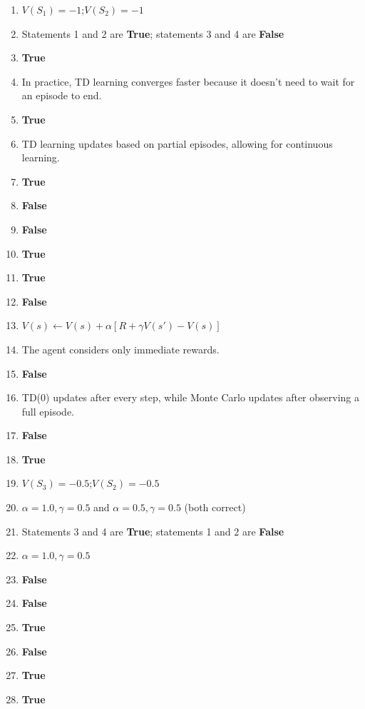 \documentclass[11pt,oneside]{article}
\begin{document}
\begin{enumerate}[label=\textbf{Q\arabic*.}, leftmargin=3em, itemsep=4pt]
  \item $V(S_1) = -1$;\quad $V(S_2) = -1$
  \item Statements 1 and 2 are \textbf{True}; statements 3 and 4 are \textbf{False}
  \item \textbf{True}
  \item In practice, TD learning converges faster because it doesn't need to wait for an episode to end.
  \item \textbf{True}
  \item TD learning updates based on partial episodes, allowing for continuous learning.
  \item \textbf{True}
  \item \textbf{False}
  \item \textbf{False}
  \item \textbf{True}
  \item \textbf{True}
  \item \textbf{False}
  \item $V(s) \leftarrow V(s) + \alpha [R + \gamma V(s') - V(s)]$
  \item The agent considers only immediate rewards.
  \item \textbf{False}
  \item TD(0) updates after every step, while Monte Carlo updates after observing a full episode.
  \item \textbf{False}
  \item \textbf{True}
  \item $V(S_3) = -0.5$;\quad $V(S_2) = -0.5$
  \item $\alpha = 1.0, \gamma = 0.5$ and $\alpha = 0.5, \gamma = 0.5$ (both correct)
  \item Statements 3 and 4 are \textbf{True}; statements 1 and 2 are \textbf{False}
  \item $\alpha = 1.0, \gamma = 0.5$
  \item \textbf{False}
  \item \textbf{False}
  \item \textbf{True}
  \item \textbf{False}
  \item \textbf{True}
  \item \textbf{True}


\end{enumerate}
\end{document}
